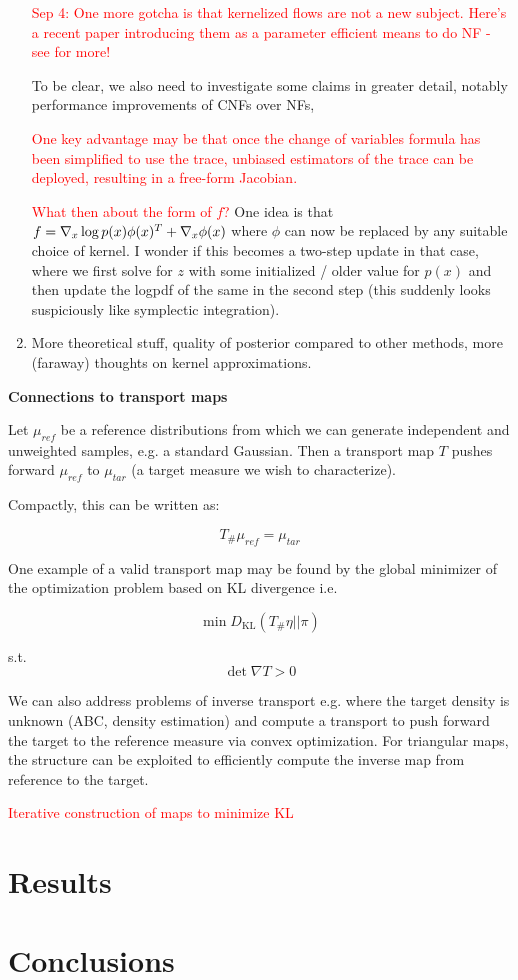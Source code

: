 \documentclass[12pt]{article}
\renewcommand{\[}{\left[}
\renewcommand{\]}{\right]}
\renewcommand{\(}{\left(}
\renewcommand{\)}{\right)}
\newcommand{\grad}[1]{\nabla #1}
\newcommand{\DKL}{D_{\mathrm{KL}}}
\begin{document}
\begin{enumerate}
    \textcolor{red}{Sep 4: One more gotcha is that kernelized flows are not a new subject. Here's a recent paper introducing them as a parameter efficient means to do NF - see \cite{english_kernelised_2024} for more!}

    To be clear, we also need to investigate some claims in greater detail, notably performance improvements of CNFs over NFs, 

    \textcolor{red}{One key advantage may be that once the change of variables formula has been simplified to use the trace, unbiased estimators of the trace can be deployed, resulting in a free-form Jacobian.}

    \textcolor{red}{What then about the form of $f$?} One idea is that $f = \grad_x \log p(x) \phi(x)^T + \grad_x \phi(x)$ where $\phi$ can now be replaced by any suitable choice of kernel. I wonder if this becomes a two-step update in that case, where we first solve for $z$ with some initialized / older value for $p(x)$ and then update the logpdf of the same in the second step (this suddenly looks suspiciously like symplectic integration).

    \item More theoretical stuff, quality of posterior compared to other methods, more (faraway) thoughts on kernel approximations.
\end{enumerate}

\noindent \textbf{Connections to transport maps}

Let $\mu_{ref}$ be a reference distributions from which we can generate independent and unweighted samples, e.g. a standard Gaussian. Then a transport map $T$ pushes forward $\mu_{ref}$ to $\mu_{tar}$ (a target measure we wish to characterize). 

Compactly, this can be written as:

$$T_{\#}\mu_{ref} = \mu_{tar}$$

One example of a valid transport map may be found by the global minimizer of the optimization problem based on KL divergence i.e.

$$\min \DKL (T_{\#} \eta || \pi)$$

s.t. $$\det \nabla T > 0$$

We can also address problems of inverse transport e.g. where the target density is unknown (ABC, density estimation) and compute a transport to push forward the target to the reference measure via convex optimization. For triangular maps, the structure can be exploited to efficiently compute the inverse map from reference to the target.

\textcolor{red}{Iterative construction of maps to minimize KL}

\section{Results}

\section{Conclusions}



\end{document}
